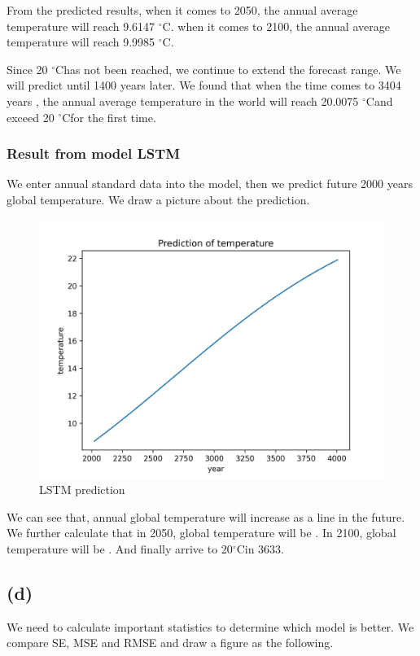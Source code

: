 \documentclass{apmcmthesis}
\def\oc{$^{\circ}$C\;}
\begin{document}
From the predicted results, when it comes to 2050, the annual average temperature will reach 9.6147 \oc. when it comes to 2100, the annual average temperature will reach 9.9985 \oc.

Since 20 \oc has not been reached, we continue to extend the forecast range. We will predict until 1400 years later. We found that when the time comes to 3404 years , the annual average temperature in the world will reach 20.0075 \oc and exceed 20 \oc for the first time.

\subsubsection{Result from model LSTM}

We enter annual standard data into the model, then we predict future 2000 years global temperature.
We draw a picture about the prediction.

\begin{figure}[htbp]
  \centering
  \includegraphics[scale=0.15]{LSTM prediction.jpg}
  \caption{LSTM prediction}
\end{figure}

We can see that, annual global temperature will increase as a line in the future.
We further calculate that in 2050, global temperature will be .
In 2100, global temperature will be .
And finally arrive to 20\oc in 3633.


\subsection{(d)}
We need to calculate important statistics to determine which model is better. 
We compare SE, MSE and RMSE and draw a figure as the following.
\end{document}
